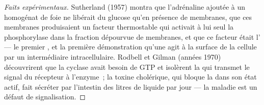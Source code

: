 \begin{proof}[Faits expérimentaux]
Sutherland (1957) montra que l'adrénaline ajoutée à un homogénat de foie
ne libérait du glucose qu'en présence de membranes, que ces membranes
produisaient un facteur thermostable qui activait à lui seul la
phosphorylase dans la fraction dépourvue de membranes, et que ce facteur
était l' --- le premier , et la première
démonstration qu'une  agit à la surface de la cellule par un
intermédiaire intracellulaire. Rodbell et Gilman (années 1970)
découvrirent que la cyclase avait besoin de GTP et isolèrent la  qui transmet le signal du récepteur à l'enzyme~; la toxine cholérique,
qui bloque la  dans son état actif, fait sécréter par
l'intestin des litres de liquide par jour --- la maladie est un défaut de
signalisation.
\end{proof}

